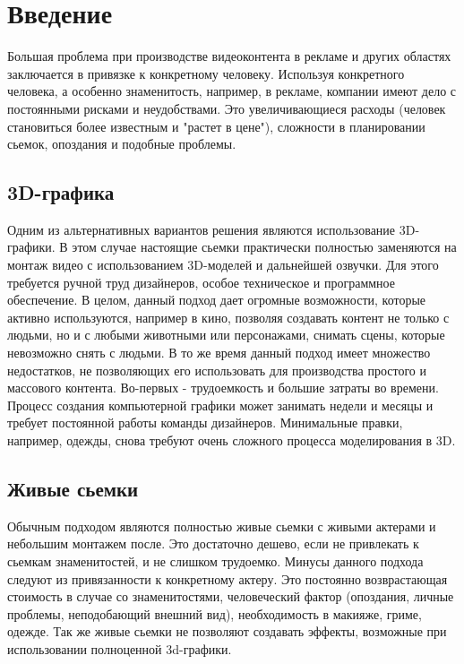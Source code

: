 \section{Введение}

Большая проблема при производстве видеоконтента в рекламе и других областях заключается в привязке к конкретному человеку. Используя конкретного человека, а особенно знаменитость, например, в рекламе, компании имеют дело с постоянными рисками и неудобствами. Это увеличивающиеся расходы (человек становиться более известным и "растет в цене"), сложности в планировании сьемок, опоздания и подобные проблемы.

\subsection*{3D-графика}

Одним из альтернативных вариантов решения являются использование 3D-графики. В этом случае настоящие сьемки практически полностью заменяются на монтаж видео с использованием 3D-моделей и дальнейшей озвучки.
Для этого требуется ручной труд дизайнеров, особое техническое и программное обеспечение.
В целом, данный подход дает огромные возможности, которые активно используются, например в кино, позволяя создавать контент не только с людьми, но и с любыми животными или персонажами, снимать сцены, которые невозможно снять с людьми.
В то же время данный подход имеет множество недостатков, не позволяющих его использовать для производства простого и массового контента. Во-первых - трудоемкость и большие затраты во времени. Процесс создания компьютерной графики может занимать недели и месяцы и требует постоянной работы команды дизайнеров. Минимальные правки, например, одежды, снова требуют очень сложного процесса моделирования в 3D.

\subsection*{Живые сьемки}

Обычным подходом являются полностью живые сьемки с живыми актерами и небольшим монтажем после. Это достаточно дешево, если не привлекать к сьемкам знаменитостей, и не слишком трудоемко. Минусы данного подхода следуют из привязанности к конкретному актеру.
Это постоянно возврастающая стоимость в случае со знаменитостями, человеческий фактор (опоздания, личные проблемы, неподобающий внешний вид), необходимость в макияже, гриме, одежде. Так же живые сьемки не позволяют создавать эффекты, возможные при использовании полноценной 3d-графики.

